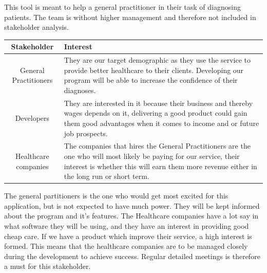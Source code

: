This tool is meant to help a general practitioner in their task of diagnosing patients. The team is without higher management and therefore not included in stakeholder analysis.
\begin{center}
	\begin{tabular}[h]{|c|p{22em}|}
		\hline
		Stakeholder & Interest \\ \hline
		General Practitioners & They are our target demographic as they use the service to provide better healthcare to their clients. Developing our program will be able to increase the confidence of their diagnoses. \\ \hline
		Developers & They are interested in it because their business and thereby wages depends on it, delivering a good product could gain them good advantages when it comes to income and or future job prospects. \\ \hline
		Healthcare companies & The companies that hires the General Practitioners are the one who will most likely be paying for our service, their interest is whether this will earn them more revenue either in the long run or short term.\\ \hline
	\end{tabular}
\end{center}
The general partitioners is the one who would get most excited for this application, but is not expected to have much power. They will be kept informed about the program and it's features.
\newline
The Healthcare companies have a lot say in what software they will be using, and they have an interest in providing good cheap care. If we have a product which improve their service, a high interest is formed. This means that the healthcare companies are to be managed closely during the development to achieve success. Regular detailed meetings is therefore a must for this stakeholder.

